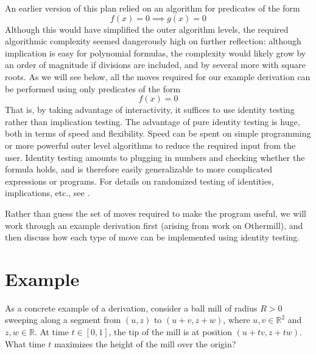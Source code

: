 \documentclass[11pt]{article}
\newcommand{\R}{\mathbb{R}}
\begin{document}
An earlier version of this plan relied on an algorithm for predicates of the form
$$f(x) = 0 \implies g(x) = 0$$
Although this would have simplified the outer algorithm levels,
the required algorithmic complexity seemed dangerously high on further reflection: although implication
is easy for polynomial formulas, the complexity would likely grow by an order of magnitude if divisions
are included, and by several more with square roots.  As we will see below, all the moves required for
our example derivation can be performed using only predicates of the form
$$f(x) = 0$$
That is, by taking advantage of interactivity, it suffices to use identity testing rather than implication
testing.  The advantage of pure identity testing is huge, both in terms of speed and flexibility.  Speed
can be spent on simple programming or more powerful outer level algorithms to reduce the required input
from the user.  Identity testing amounts to plugging in numbers and checking whether the formula holds,
and is therefore easily generalizable to more complicated expressions or programs.  For details on randomized
testing of identities, implications, etc., see \cite{schwartz1980fast,tulone2001randomized,chen2011partial}.

Rather than guess the set of moves required to make the program useful, we will work through an example
derivation first (arising from work on Othermill), and then discuss how each type of move can be implemented
using identity testing.

\section{Example}

As a concrete example of a derivation, consider a ball mill of radius $R > 0$ sweeping along a segment
from $(u,z)$ to $(u+v,z+w)$, where $u,v \in \R^2$ and $z,w \in \R$.  At time $t \in [0,1]$, the tip
of the mill is at position $(u+tv,z+tw)$.  What time $t$ maximizes the height of the mill over the origin?
\end{document}
